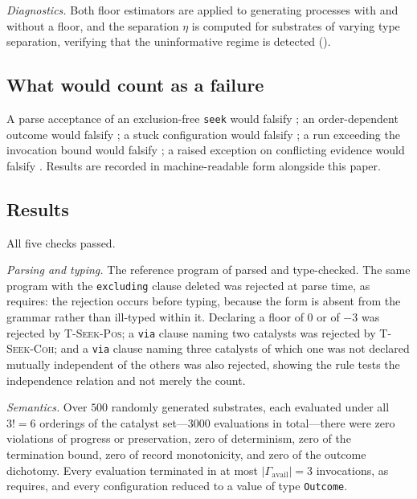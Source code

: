 \documentclass[11pt,a4paper]{article}
\theoremstyle{thmstyle}
\theoremstyle{definition}
\theoremstyle{remark}
\newcommand{\abs}[1]{\lvert#1\rvert}
\begin{document}
\emph{Diagnostics.} Both floor estimators are applied to generating
processes with and without a floor, and the separation $\eta$ is computed
for substrates of varying type separation, verifying that the uninformative
regime is detected ().

\subsection{What would count as a failure}

A parse acceptance of an exclusion-free \texttt{seek} would falsify
; an order-dependent outcome would falsify
; a stuck configuration would falsify
; a run exceeding the invocation bound would falsify
; a raised exception on conflicting evidence would
falsify . Results are recorded in machine-readable form
alongside this paper.




\subsection{Results}
\label{sec:results}

All five checks passed.

\emph{Parsing and typing.} The reference program of
 parsed and type-checked. The same program with the
\texttt{excluding} clause deleted was rejected at parse time, as
 requires: the rejection occurs before typing, because the
form is absent from the grammar rather than ill-typed within it. Declaring a
floor of $0$ or of $-3$ was rejected by \textsc{T-Seek-Pos}; a
\texttt{via} clause naming two catalysts was rejected by
\textsc{T-Seek-Coh}; and a \texttt{via} clause naming three catalysts of
which one was not declared mutually independent of the others was also
rejected, showing the rule tests the independence relation and not merely
the count.

\emph{Semantics.} Over $500$ randomly generated substrates, each evaluated
under all $3!=6$ orderings of the catalyst set---$3000$ evaluations in
total---there were zero violations of progress or preservation, zero of
determinism, zero of the termination bound, zero of record monotonicity, and
zero of the outcome dichotomy. Every evaluation terminated in at most
$\abs{\Gamma_{\mathrm{avail}}}=3$ invocations, as 
requires, and every configuration reduced to a value of type
\texttt{Outcome}.
\end{document}
